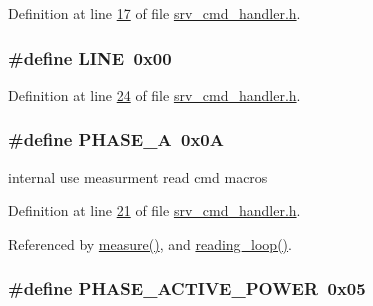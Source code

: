 Definition at line \hyperlink{a00043_source_l00017}{17} of file \hyperlink{a00043_source}{srv\-\_\-cmd\-\_\-handler.\-h}.

\hypertarget{a00043_af94cfb03461685fead1fe045d5c96f01}{
\subsubsection[{L\-I\-N\-E}]{\setlength{\rightskip}{0pt plus 5cm}\#define L\-I\-N\-E~0x00}}\label{d6/d42/a00043_af94cfb03461685fead1fe045d5c96f01}


Definition at line \hyperlink{a00043_source_l00024}{24} of file \hyperlink{a00043_source}{srv\-\_\-cmd\-\_\-handler.\-h}.

\hypertarget{a00043_ad214039f52b011ce2bd6c85ff98a981b}{
\subsubsection[{P\-H\-A\-S\-E\-\_\-\-A}]{\setlength{\rightskip}{0pt plus 5cm}\#define P\-H\-A\-S\-E\-\_\-\-A~0x0\-A}}\label{d6/d42/a00043_ad214039f52b011ce2bd6c85ff98a981b}


internal use measurment read cmd macros 



Definition at line \hyperlink{a00043_source_l00021}{21} of file \hyperlink{a00043_source}{srv\-\_\-cmd\-\_\-handler.\-h}.



Referenced by \hyperlink{a00042_source_l00040}{measure()}, and \hyperlink{a00035_source_l00302}{reading\-\_\-loop()}.

\hypertarget{a00043_abd3f95c7cd63d0627552d293bf49e026}{
\subsubsection[{P\-H\-A\-S\-E\-\_\-\-A\-C\-T\-I\-V\-E\-\_\-\-P\-O\-W\-E\-R}]{\setlength{\rightskip}{0pt plus 5cm}\#define P\-H\-A\-S\-E\-\_\-\-A\-C\-T\-I\-V\-E\-\_\-\-P\-O\-W\-E\-R~0x05}}\label{d6/d42/a00043_abd3f95c7cd63d0627552d293bf49e026}


